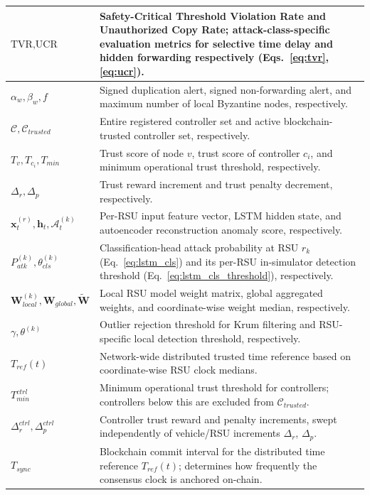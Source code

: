 \documentclass[12pt, a4paper]{report}
\begin{document}
\begin{longtable}{|m{5.0cm}|m{9.0cm}|}
\hline
$\text{TVR}, \text{UCR}$ & Safety-Critical Threshold Violation Rate and Unauthorized Copy Rate; attack-class-specific evaluation metrics for selective time delay and hidden forwarding respectively (Eqs.~\ref{eq:tvr}, \ref{eq:ucr}). \\
\hline
$\alpha_w, \beta_w, f$ & Signed duplication alert, signed non-forwarding alert, and maximum number of local Byzantine nodes, respectively. \\
\hline
$\mathcal{C}, \mathcal{C}_{trusted}$ & Entire registered controller set and active blockchain-trusted controller set, respectively. \\
\hline
$T_v, T_{c_i}, T_{min}$ & Trust score of node $v$, trust score of controller $c_i$, and minimum operational trust threshold, respectively. \\
\hline
$\Delta_r, \Delta_p$ & Trust reward increment and trust penalty decrement, respectively. \\
\hline
$\mathbf{x}_t^{(r)}, \mathbf{h}_t, \mathcal{A}_t^{(k)}$ & Per-\ac{RSU} input feature vector, LSTM hidden state, and autoencoder reconstruction anomaly score, respectively. \\
\hline
$P_{atk}^{(k)}, \theta_{cls}^{(k)}$ & Classification-head attack probability at \ac{RSU} $r_k$ (Eq.~\ref{eq:lstm_cls}) and its per-\ac{RSU} in-simulator detection threshold (Eq.~\ref{eq:lstm_cls_threshold}), respectively. \\
\hline
$\mathbf{W}_{local}^{(k)}, \mathbf{W}_{global}, \tilde{\mathbf{W}}$ & Local RSU model weight matrix, global aggregated weights, and coordinate-wise weight median, respectively. \\
\hline
$\gamma, \theta^{(k)}$ & Outlier rejection threshold for Krum filtering and RSU-specific local detection threshold, respectively. \\
\hline
$T_{ref}(t)$ & Network-wide distributed trusted time reference based on coordinate-wise RSU clock medians. \\
\hline
$T_{min}^{ctrl}$ & Minimum operational trust threshold for controllers; controllers below this are excluded from $\mathcal{C}_{trusted}$. \\
\hline
$\Delta_r^{ctrl}, \Delta_p^{ctrl}$ & Controller trust reward and penalty increments, swept independently of vehicle/RSU increments $\Delta_r$, $\Delta_p$. \\
\hline
$T_{sync}$ & Blockchain commit interval for the distributed time reference $T_{ref}(t)$; determines how frequently the consensus clock is anchored on-chain. \\

\end{longtable}
\end{document}
